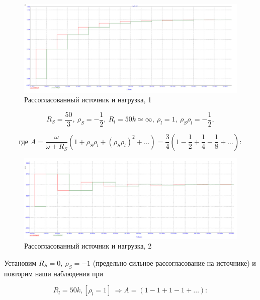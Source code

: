 \documentclass[a4paper, 14pt]{extarticle}%
\begin{document}
\newpage

\begin{figure}[h!]
			\centering
			\includegraphics[width=1.1\linewidth]{./graphs/14.jpg}
			\caption{Рассогласованный источник и нагрузка, 1}
			\label{4.1}
\end{figure}

\[R_{S}=\frac{50}{3},\ \rho_{S}=-\frac{1}{2},\  R_{l}=50k \simeq \infty,\ \rho_{l}=1,\ \rho_{S} \rho_{l}=-\frac{1}{2},\]

\[ \text{где }A=\frac{\omega}{\omega+R_{S}}\left(1+\rho_{S} \rho_{l}+\left(\rho_{S} \rho_{l}\right)^{2}+\ldots\right)=\frac{3}{4}\left(1-\frac{1}{2}+\frac{1}{4}-\frac{1}{8}+\ldots\right) :\]

\begin{figure}[h!]
			\centering
			\includegraphics[width=1.1\linewidth]{./graphs/15.jpg}
			\caption{Рассогласованный источник и нагрузка, 2}
			\label{4.2}
\end{figure}

Установим $R_{S}=0,\ \rho_{S}=-1$ (предельно сильное рассогласование на источнике) и повторим наши наблюдения при

\[ R_{l}=50 k, \left[\rho_{l}=1\right] \ \Rightarrow A=(1-1+1-1+\ldots) : \]
\end{document}
